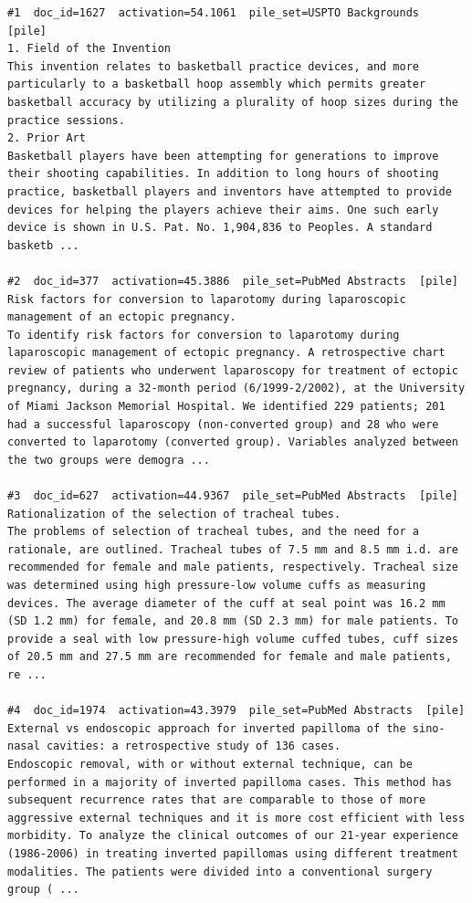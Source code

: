 \begin{verbatim}
#1  doc_id=1627  activation=54.1061  pile_set=USPTO Backgrounds  [pile]
1. Field of the Invention
This invention relates to basketball practice devices, and more particularly to a basketball hoop assembly which permits greater basketball accuracy by utilizing a plurality of hoop sizes during the practice sessions.
2. Prior Art
Basketball players have been attempting for generations to improve their shooting capabilities. In addition to long hours of shooting practice, basketball players and inventors have attempted to provide devices for helping the players achieve their aims. One such early device is shown in U.S. Pat. No. 1,904,836 to Peoples. A standard basketb ...

#2  doc_id=377  activation=45.3886  pile_set=PubMed Abstracts  [pile]
Risk factors for conversion to laparotomy during laparoscopic management of an ectopic pregnancy.
To identify risk factors for conversion to laparotomy during laparoscopic management of ectopic pregnancy. A retrospective chart review of patients who underwent laparoscopy for treatment of ectopic pregnancy, during a 32-month period (6/1999-2/2002), at the University of Miami Jackson Memorial Hospital. We identified 229 patients; 201 had a successful laparoscopy (non-converted group) and 28 who were converted to laparotomy (converted group). Variables analyzed between the two groups were demogra ...

#3  doc_id=627  activation=44.9367  pile_set=PubMed Abstracts  [pile]
Rationalization of the selection of tracheal tubes.
The problems of selection of tracheal tubes, and the need for a rationale, are outlined. Tracheal tubes of 7.5 mm and 8.5 mm i.d. are recommended for female and male patients, respectively. Tracheal size was determined using high pressure-low volume cuffs as measuring devices. The average diameter of the cuff at seal point was 16.2 mm (SD 1.2 mm) for female, and 20.8 mm (SD 2.3 mm) for male patients. To provide a seal with low pressure-high volume cuffed tubes, cuff sizes of 20.5 mm and 27.5 mm are recommended for female and male patients, re ...

#4  doc_id=1974  activation=43.3979  pile_set=PubMed Abstracts  [pile]
External vs endoscopic approach for inverted papilloma of the sino-nasal cavities: a retrospective study of 136 cases.
Endoscopic removal, with or without external technique, can be performed in a majority of inverted papilloma cases. This method has subsequent recurrence rates that are comparable to those of more aggressive external techniques and it is more cost efficient with less morbidity. To analyze the clinical outcomes of our 21-year experience (1986-2006) in treating inverted papillomas using different treatment modalities. The patients were divided into a conventional surgery group ( ...


\end{verbatim}
